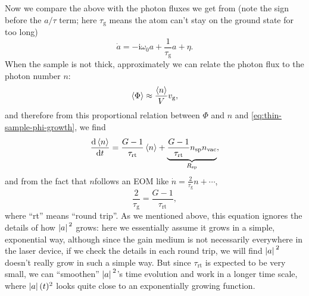 \documentclass[hyperref, a4paper]{article}
\newcommand*{\ii}{\mathrm{i}}
\newcommand*{\taug}{\tau_{\text{g}}}
\begin{document}
Now we compare the above with the photon fluxes we get from 
(note the sign before the $a/\tau$ term; 
here $\taug$ means the atom can't stay on the ground state for too long)
\begin{equation}
    \dot{a} = - \ii \omega_0 a + \frac{1}{\taug} a + \eta.
\end{equation}
When the sample is not thick, approximately we can relate the photon flux to the photon number $n$:
\begin{equation}
    \expval{\Phi} \approx \frac{\expval{n}}{V} v_{\text{g}},
\end{equation}
and therefore from this proportional relation between $\Phi$ and $n$ and \eqref{eq:thin-sample-phi-growth}, we find 
\begin{equation}
    \dv{\expval{n}}{t} = \frac{G-1}{\tau_{\text{rt}}} \expval{n} + \underbrace{\frac{G-1}{\tau_{\text{rt}}} n_{\text{sp}} n_{\text{vac}}}_{R_{\text{sp}}},
    \label{eq:round-trip-n-eom}
\end{equation}
and from the fact that $n$follows an EOM like $\dot{n} = \frac{2}{\taug} n + \cdots$,
\begin{equation}
    \frac{2}{\taug} = \frac{G-1}{\tau_{\text{rt}}},
\end{equation}
where ``rt'' means ``round trip''. 
As we mentioned above, this equation ignores the details of how $\abs*{a}^2$ grows:
here we essentially assume it grows in a simple, exponential way,
although since the gain medium is not necessarily everywhere in the laser device,
if we check the details in each round trip, we will find $\abs*{a}^2$ doesn't really grow in such a simple way.
But since $\tau_{\text{rt}}$ is expected to be very small,
we can ``smoothen'' $\abs*{a}^2$'s time evolution and work in a longer time scale,
where $\abs*{a}(t)^2$ looks quite close to an exponentially growing function.
\end{document}
